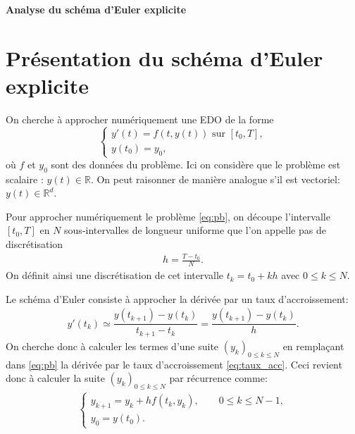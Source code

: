 \documentclass[12pt,a4paper,twoside]{article}
\begin{document}


\newcommand*{\R}{\mathbb{R}}

\begin{center}
{\bf \Huge Analyse du sch\'ema d'Euler explicite}
\end{center}


\section{Pr\'esentation du sch\'ema d'Euler explicite}

On cherche \`a approcher num\'eriquement une EDO de la forme
\begin{equation}
  \label{eq:pb}
  \left\{
    \begin{array}{l}
      y'(t) = f(t,y(t)) \text{ sur } [t_0,T] ,
      \\
      y(t_0) = y_0 ,
    \end{array}
  \right.
\end{equation}
o\`u $f$ et $y_0$ sont des donn\'ees du probl\`eme.
Ici on consid\`ere que le probl\`eme est scalaire : $y(t) \in \R$.
On peut raisonner de mani\`ere analogue s'il est vectoriel:
$y(t) \in \R^d$.

Pour approcher num\'eriquement le probl\`eme \eqref{eq:pb}, on d\'ecoupe l'intervalle
$[t_0,T]$ en $N$ sous-intervalles de longueur uniforme que l'on appelle
pas de discr\'etisation
\begin{align*}
  h = \frac{T - t_0}{N} .
\end{align*}
On d\'efinit ainsi une discr\'etisation 
de cet intervalle $t_k = t_0 + kh$ avec $0 \leq k \leq N$.


Le sch\'ema d'Euler consiste \`a approcher la d\'eriv\'ee par un taux d'accroissement:
\begin{align}
  \label{eq:taux_acc}
  y'(t_k) \simeq \dfrac{y(t_{k+1}) - y(t_k)}{t_{k+1} - t_k } = \dfrac{y(t_{k+1}) - y(t_k)}{h} .
\end{align}
On cherche donc \`a calculer les termes d'une suite $(y_k)_{0 \leq k \leq N}$
en rempla\c{c}ant dans \eqref{eq:pb} la d\'eriv\'ee par le taux d'accroissement
\eqref{eq:taux_acc}.
Ceci revient donc \`a calculer la suite $(y_k)_{0 \leq k \leq N}$ par r\'ecurrence comme:
\begin{align*}
  \left\{
  \begin{array}{l}
    y_{k+1} = y_k + h f(t_k , y_k), \qquad 0 \leq k \leq N-1 ,
    \\
    y_0 = y(t_0) .
  \end{array}
  \right.
\end{align*}
\end{document}
